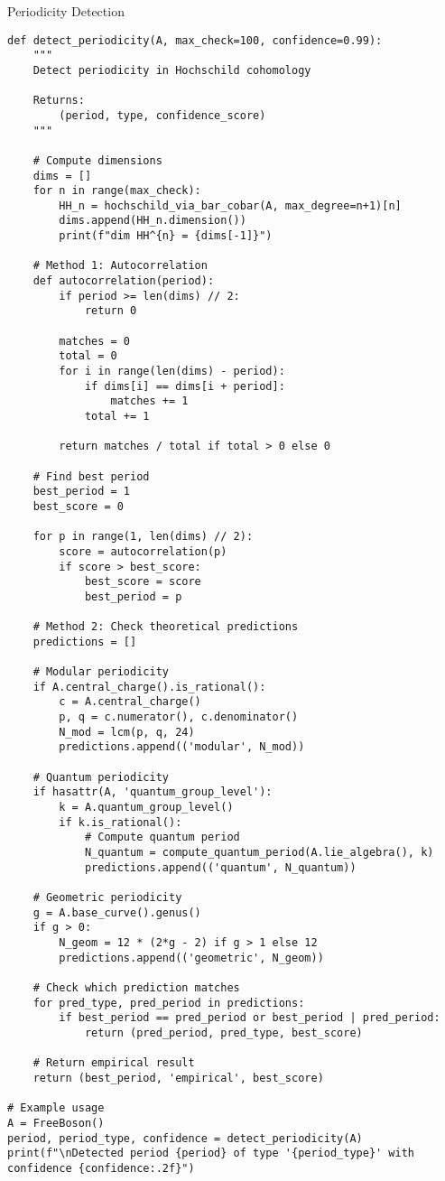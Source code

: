\begin{algorithm}
\caption{Periodicity Detection}
\begin{verbatim}
def detect_periodicity(A, max_check=100, confidence=0.99):
    """
    Detect periodicity in Hochschild cohomology
    
    Returns:
        (period, type, confidence_score)
    """
    
    # Compute dimensions
    dims = []
    for n in range(max_check):
        HH_n = hochschild_via_bar_cobar(A, max_degree=n+1)[n]
        dims.append(HH_n.dimension())
        print(f"dim HH^{n} = {dims[-1]}")
    
    # Method 1: Autocorrelation
    def autocorrelation(period):
        if period >= len(dims) // 2:
            return 0
        
        matches = 0
        total = 0
        for i in range(len(dims) - period):
            if dims[i] == dims[i + period]:
                matches += 1
            total += 1
        
        return matches / total if total > 0 else 0
    
    # Find best period
    best_period = 1
    best_score = 0
    
    for p in range(1, len(dims) // 2):
        score = autocorrelation(p)
        if score > best_score:
            best_score = score
            best_period = p
    
    # Method 2: Check theoretical predictions
    predictions = []
    
    # Modular periodicity
    if A.central_charge().is_rational():
        c = A.central_charge()
        p, q = c.numerator(), c.denominator()
        N_mod = lcm(p, q, 24)
        predictions.append(('modular', N_mod))
    
    # Quantum periodicity  
    if hasattr(A, 'quantum_group_level'):
        k = A.quantum_group_level()
        if k.is_rational():
            # Compute quantum period
            N_quantum = compute_quantum_period(A.lie_algebra(), k)
            predictions.append(('quantum', N_quantum))
    
    # Geometric periodicity
    g = A.base_curve().genus()
    if g > 0:
        N_geom = 12 * (2*g - 2) if g > 1 else 12
        predictions.append(('geometric', N_geom))
    
    # Check which prediction matches
    for pred_type, pred_period in predictions:
        if best_period == pred_period or best_period | pred_period:
            return (pred_period, pred_type, best_score)
    
    # Return empirical result
    return (best_period, 'empirical', best_score)

# Example usage
A = FreeBoson()
period, period_type, confidence = detect_periodicity(A)
print(f"\nDetected period {period} of type '{period_type}' with confidence {confidence:.2f}")
\end{verbatim}
\end{algorithm}

